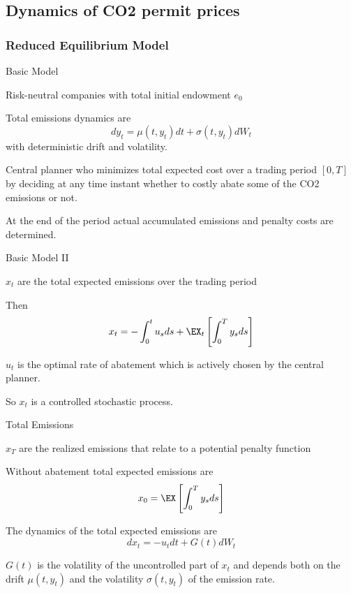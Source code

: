 \subsection{Dynamics of CO2 permit prices}
\subsubsection{Reduced Equilibrium Model}

{Basic Model}




\item<1-> Risk-neutral companies with total initial endowment $e_0$
\item<2-> Total emissions dynamics are
\begin{equation}
dy_t= \mu(t, y_t)dt + \sigma(t, y_t)dW_t
\end{equation}
with deterministic drift and volatility.
\item<3-> Central planner who minimizes total expected cost over a trading period $[0,T]$ by deciding at any time instant
whether to costly abate some of the CO2 emissions or not.
\item<4-> At the end of the period actual accumulated emissions and penalty costs are determined.





{Basic Model II}




\item<1-> $x_t$ are the total expected emissions over the trading period
\item<2-> Then
\begin{equation}
x_t=-\int_0^tu_s ds + \EX_t\left[\int_0^T y_s ds \right]
\end{equation}
\item<3-> $u_t$ is the optimal rate of abatement which is  actively chosen by the central planner.
\item<4-> So $x_t$ is a controlled stochastic process.





{Total Emissions}




\item<1-> $x_T$ are the realized emissions that relate to a potential penalty function
\item<2-> Without abatement total expected emissions  are
$$
x_0=\EX\left[\int_0^T y_s ds \right]
$$
\item<3-> The dynamics of the total expected emissions are
\begin{equation}
dx_t=-u_t dt + G(t) dW_t
\end{equation}
\item<4-> $G(t)$ is the volatility of the uncontrolled part of $x_t$ and depends both on the drift $\mu(t, y_t)$
and the volatility $\sigma(t,y_t)$ of the emission rate.


